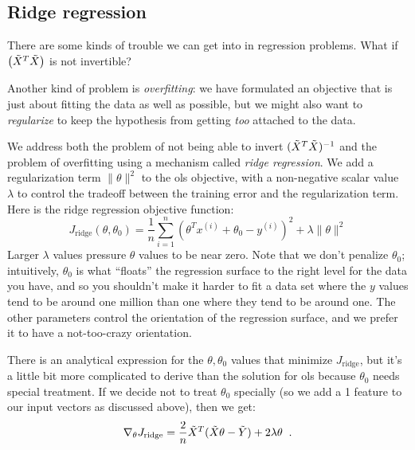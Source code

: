 \subsection{Ridge regression}

\label{sec-ridge_regression}

There are some kinds of trouble we can get into in regression problems.
What if $\left(\tilde{X}^T\tilde{X}\right)$ is not invertible?

Another kind of problem is {\em overfitting}: we have formulated an
objective that is just about fitting the data as well as possible, but
we might also
want to {\em regularize} to keep the hypothesis from getting {\em too}
attached to the data.

We address both the problem of not being able to invert $(\tilde{X}^T\tilde{X})^{-1}$ and
the problem of overfitting using a mechanism called {\em ridge
    regression}.  We add a regularization term $\|\theta\|^2$ to the
  {\sc ols} objective, with a non-negative scalar value $\lambda$ to control the tradeoff
between the training error and the regularization term.
Here is the ridge regression objective function:
$$ J_{\text{ridge}}(\theta, \theta_0) = \frac{1}{n}\sum_{i = 1}^n\left(\theta^Tx^{(i)} + \theta_0 - y^{(i)}\right)^2 + \lambda\|\theta\|^2 $$
Larger $\lambda$ values pressure $\theta$ values to be near zero.
Note that we don't penalize $\theta_0$; intuitively, $\theta_0$ is
what ``floats'' the regression surface to the right level for the data
you have, and so you shouldn't make it harder to fit a data set where
the $y$ values tend to be around one million than one where they tend
to be around one.  The other parameters control the orientation of the
regression surface, and we prefer it to have a not-too-crazy
orientation.

There is an analytical expression for the $\theta, \theta_0$ values
that minimize $J_\text{ridge}$, but it's a little bit more complicated
to derive than the solution for {\sc ols} because $\theta_0$ needs
special treatment.   If we decide not to treat $\theta_0$ specially
(so we add a 1 feature to our input vectors as discussed above), then we get:
$$ \nabla_{\theta}J_\text{ridge} = \frac{2}{n}\tilde{X}^T(\tilde{X}\theta - \tilde{Y}) + 2
  \lambda \theta\;\;.$$

